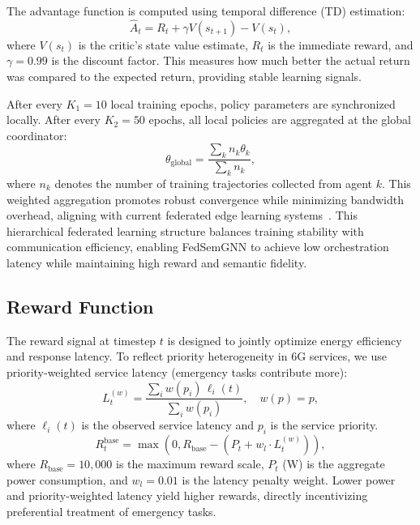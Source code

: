 \documentclass[conference]{IEEEtran}
\begin{document}
	The advantage function is computed using temporal difference (TD) estimation:
	\begin{equation}
		\hat{A}_t = R_t + \gamma V(s_{t+1}) - V(s_t),
	\end{equation}
	where $V(s_t)$ is the critic's state value estimate, $R_t$ is the immediate reward, and $\gamma = 0.99$ is the discount factor. This measures how much better the actual return was compared to the expected return, providing stable learning signals.
	
	After every $K_1 = 10$ local training epochs, policy parameters are synchronized locally. After every $K_2 = 50$ epochs, all local policies are aggregated at the global coordinator:
	\begin{equation}
		\theta_{\text{global}} = \frac{\sum_{k} n_k \theta_k}{\sum_{k} n_k},
	\end{equation}
	\textcolor{revblue}{where $n_k$ denotes the number of training trajectories collected from agent $k$. This weighted aggregation promotes robust convergence while minimizing bandwidth overhead, aligning with current federated edge learning systems~\cite{zhou2024robustfl, yurdem2024federated}. This hierarchical federated learning structure balances training stability with communication efficiency, enabling FedSemGNN to achieve low orchestration latency while maintaining high reward and semantic fidelity.}
	
	\subsection{Reward Function}
	The reward signal at timestep $t$ is designed to jointly optimize energy efficiency and response latency. To reflect priority heterogeneity in 6G services, we use priority-weighted service latency (emergency tasks contribute more):
	\begin{equation}
	L_t^{(w)} = \frac{\sum_i w(p_i)\,\ell_i(t)}{\sum_i w(p_i)},\quad w(p)=p, 
	\end{equation}
	where $\ell_i(t)$ is the observed service latency and $p_i$ is the service priority.
	\begin{equation}
		R_t^{\text{base}} = \max\!\left(0, R_{\text{base}} - \left(P_t + w_l \cdot L_t^{(w)}\right)\right),
		\label{eq:base_reward}
	\end{equation}
	where $R_{\text{base}} = 10{,}000$ is the maximum reward scale, $P_t$ (W) is the aggregate power consumption, and $w_l = 0.01$ is the latency penalty weight. Lower power and priority-weighted latency yield higher rewards, directly incentivizing preferential treatment of emergency tasks.
	
\end{document}
